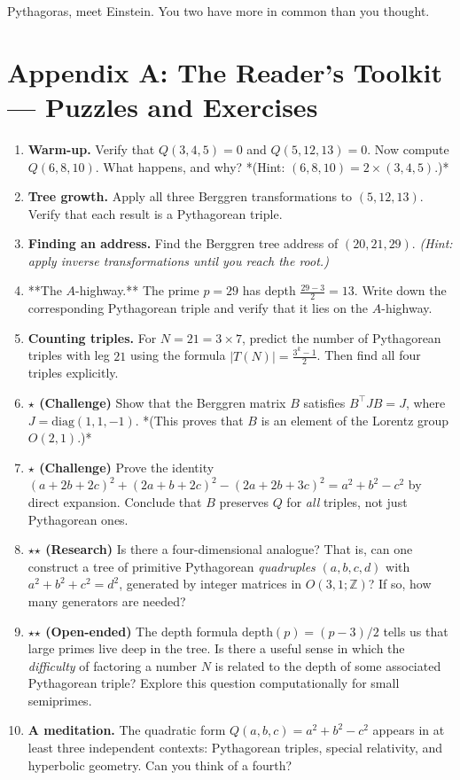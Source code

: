 Pythagoras, meet Einstein. You two have more in common than you thought.


\bigskip


\section{Appendix A: The Reader's Toolkit --- Puzzles and Exercises}

\begin{enumerate}
\item \textbf{Warm-up.} Verify that $Q(3, 4, 5) = 0$ and $Q(5, 12, 13) = 0$. Now compute $Q(6, 8, 10)$. What happens, and why? *(Hint: $(6, 8, 10) = 2 \times (3, 4, 5)$.)*
\item \textbf{Tree growth.} Apply all three Berggren transformations to $(5, 12, 13)$. Verify that each result is a Pythagorean triple.
\item \textbf{Finding an address.} Find the Berggren tree address of $(20, 21, 29)$. \textit{(Hint: apply inverse transformations until you reach the root.)}
\item **The $A$-highway.** The prime $p = 29$ has depth $\frac{29 - 3}{2} = 13$. Write down the corresponding Pythagorean triple and verify that it lies on the $A$-highway.
\item \textbf{Counting triples.} For $N = 21 = 3 \times 7$, predict the number of Pythagorean triples with leg $21$ using the formula $|T(N)| = \frac{3^k - 1}{2}$. Then find all four triples explicitly.
\item \textbf{\ensuremath{\star} (Challenge)} Show that the Berggren matrix $B$ satisfies $B^\top J B = J$, where $J = \text{diag}(1, 1, -1)$. *(This proves that $B$ is an element of the Lorentz group $O(2,1)$.)*
\item \textbf{\ensuremath{\star} (Challenge)} Prove the identity $(a + 2b + 2c)^2 + (2a + b + 2c)^2 - (2a + 2b + 3c)^2 = a^2 + b^2 - c^2$ by direct expansion. Conclude that $B$ preserves $Q$ for \textit{all} triples, not just Pythagorean ones.
\item \textbf{\ensuremath{\star}\ensuremath{\star} (Research)} Is there a four-dimensional analogue? That is, can one construct a tree of primitive Pythagorean \textit{quadruples} $(a, b, c, d)$ with $a^2 + b^2 + c^2 = d^2$, generated by integer matrices in $O(3,1; \mathbb{Z})$? If so, how many generators are needed?
\item \textbf{\ensuremath{\star}\ensuremath{\star} (Open-ended)} The depth formula $\text{depth}(p) = (p-3)/2$ tells us that large primes live deep in the tree. Is there a useful sense in which the \textit{difficulty} of factoring a number $N$ is related to the depth of some associated Pythagorean triple? Explore this question computationally for small semiprimes.
\item \textbf{A meditation.} The quadratic form $Q(a, b, c) = a^2 + b^2 - c^2$ appears in at least three independent contexts: Pythagorean triples, special relativity, and hyperbolic geometry. Can you think of a fourth?
\end{enumerate}
